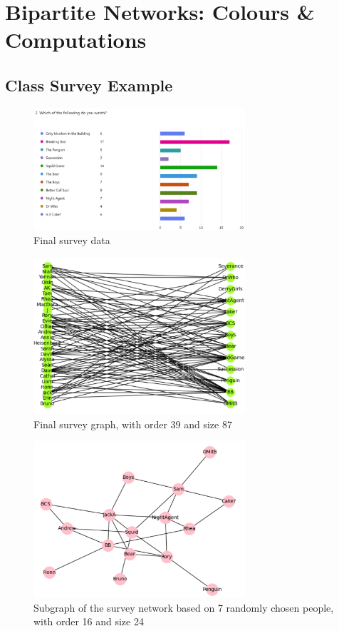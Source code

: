 \documentclass[a4paper,11pt]{article}
\begin{document}
\section{Bipartite Networks: Colours \& Computations}
\subsection{Class Survey Example}
\begin{figure}[H]
    \centering
    \includegraphics[width=0.7\textwidth]{./images/suverydata.png}
    \caption{ Final survey data }
\end{figure}

\begin{figure}[H]
    \centering
    \includegraphics[width=0.7\textwidth]{./images/suverygaaph.png}
    \caption{ Final survey graph, with order 39 and size 87 }
\end{figure}

\begin{figure}[H]
    \centering
    \includegraphics[width=0.7\textwidth]{./images/surveysubgrap.png}
    \caption{ Subgraph of the survey network based on 7 randomly chosen people, with order 16 and size 24 }
\end{figure}
\end{document}
